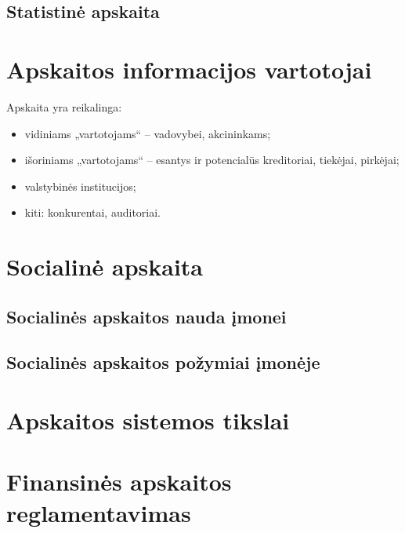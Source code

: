 \subsection{Statistinė apskaita}



\section{Apskaitos informacijos vartotojai}


Apskaita yra reikalinga:
\begin{itemize}
  \item vidiniams „vartotojams“ – vadovybei, akcininkams;
  \item išoriniams „vartotojams“ – esantys ir potencialūs kreditoriai,
    tiekėjai, pirkėjai;
  \item valstybinės institucijos;
  \item kiti: konkurentai, auditoriai.
\end{itemize}

\section{Socialinė apskaita}


\subsection{Socialinės apskaitos nauda įmonei}


\subsection{Socialinės apskaitos požymiai įmonėje}


\section{Apskaitos sistemos tikslai}


\section{Finansinės apskaitos reglamentavimas}

